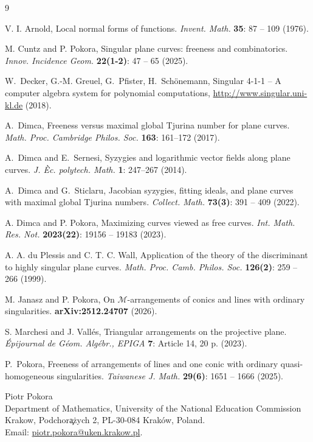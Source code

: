\documentclass[11pt]{article}
\theoremstyle{remark}
\begin{document}
\begin{thebibliography}{9}

V. I. Arnold, Local normal forms of functions. \textit{Invent. Math.} \textbf{35}: 87 -- 109 (1976).

M. Cuntz and P. Pokora, Singular plane curves: freeness and combinatorics. \textit{Innov. Incidence Geom.} \textbf{22(1-2)}: 47 -- 65 (2025).

 W.~Decker, G.-M. Greuel, G.~Pfister, H.~Sch\"onemann, Singular {4-1-1} -- {A} computer algebra system for polynomial computations, \url{http://www.singular.uni-kl.de} (2018).

A.~Dimca, Freeness versus maximal global Tjurina number for plane curves. \textit{Math. Proc. Cambridge Philos. Soc.} \textbf{163}: 161--172 (2017).

A.~Dimca and E.~Sernesi, Syzygies and logarithmic vector fields along plane curves. \textit{J. \`Ec. polytech. Math.} \textbf{1}: 247--267  (2014).

A.~Dimca and G.~Sticlaru, Jacobian syzygies, fitting ideals, and plane curves with maximal global Tjurina numbers. \textit{Collect. Math.} \textbf{73(3)}: 391 -- 409 (2022).

A. Dimca  and P. Pokora, Maximizing curves viewed as free curves. \textit{Int. Math. Res. Not.} \textbf{2023(22)}: 19156 -- 19183 (2023).

A. A. du Plessis and  C. T. C. Wall, Application of the theory of the discriminant to highly singular plane curves. \textit{Math. Proc. Camb. Philos. Soc.} \textbf{126(2)}: 259 -- 266 (1999).

M. Janasz and P. Pokora, On $\mathscr{M}$-arrangements of conics and lines with ordinary singularities. \textbf{arXiv:2512.24707} (2026).

S. Marchesi and J. Vall\'es, Triangular arrangements on the projective plane. \textit{\'Epijournal de G\'eom. Alg\'ebr., EPIGA} \textbf{7}: Article 14, 20 p. (2023).

P.~Pokora, Freeness of arrangements of lines and one conic with ordinary
quasi-homogeneous singularities. \textit{Taiwanese J. Math.} \textbf{29(6)}: 1651 -- 1666 (2025).

\end{thebibliography}
Piotr Pokora\\
\noindent
Department of Mathematics,
University of the National Education Commission Krakow,
Podchor\c a\.zych 2,
PL-30-084 Krak\'ow, Poland. \\
Email: \url{piotr.pokora@uken.krakow.pl}.
\end{document}
